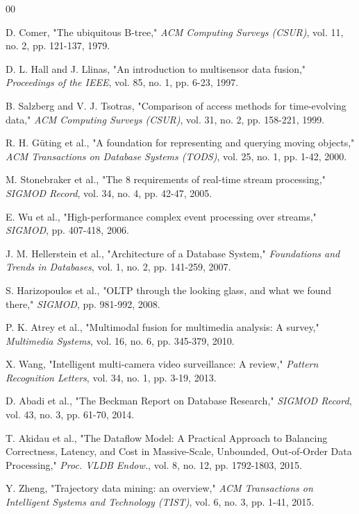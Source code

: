 \documentclass[conference]{IEEEtran}
\begin{document}
\begin{thebibliography}{00}

 D. Comer, "The ubiquitous B-tree," \textit{ACM Computing Surveys (CSUR)}, vol. 11, no. 2, pp. 121-137, 1979.

 D. L. Hall and J. Llinas, "An introduction to multisensor data fusion," \textit{Proceedings of the IEEE}, vol. 85, no. 1, pp. 6-23, 1997.

 B. Salzberg and V. J. Tsotras, "Comparison of access methods for time-evolving data," \textit{ACM Computing Surveys (CSUR)}, vol. 31, no. 2, pp. 158-221, 1999.

 R. H. Güting et al., "A foundation for representing and querying moving objects," \textit{ACM Transactions on Database Systems (TODS)}, vol. 25, no. 1, pp. 1-42, 2000.

 M. Stonebraker et al., "The 8 requirements of real-time stream processing," \textit{SIGMOD Record}, vol. 34, no. 4, pp. 42-47, 2005.

 E. Wu et al., "High-performance complex event processing over streams," \textit{SIGMOD}, pp. 407-418, 2006.

 J. M. Hellerstein et al., "Architecture of a Database System," \textit{Foundations and Trends in Databases}, vol. 1, no. 2, pp. 141-259, 2007.

 S. Harizopoulos et al., "OLTP through the looking glass, and what we found there," \textit{SIGMOD}, pp. 981-992, 2008.

 P. K. Atrey et al., "Multimodal fusion for multimedia analysis: A survey," \textit{Multimedia Systems}, vol. 16, no. 6, pp. 345-379, 2010.

 X. Wang, "Intelligent multi-camera video surveillance: A review," \textit{Pattern Recognition Letters}, vol. 34, no. 1, pp. 3-19, 2013.

 D. Abadi et al., "The Beckman Report on Database Research," \textit{SIGMOD Record}, vol. 43, no. 3, pp. 61-70, 2014.

 T. Akidau et al., "The Dataflow Model: A Practical Approach to Balancing Correctness, Latency, and Cost in Massive-Scale, Unbounded, Out-of-Order Data Processing," \textit{Proc. VLDB Endow.}, vol. 8, no. 12, pp. 1792-1803, 2015.

 Y. Zheng, "Trajectory data mining: an overview," \textit{ACM Transactions on Intelligent Systems and Technology (TIST)}, vol. 6, no. 3, pp. 1-41, 2015.


\end{thebibliography}
\end{document}
